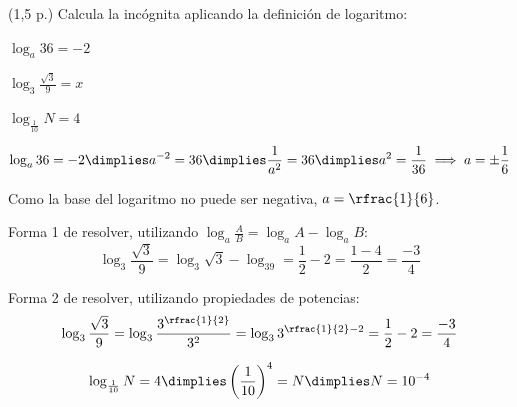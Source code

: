 \documentclass[palatino,nosec]{Docencia}
\begin{document}
\begin{problem} (1,5 p.)
Calcula la incógnita aplicando la definición de logaritmo:

\ppart $\log_a 36 = -2$

\ppart $\log_3\frac{\sqrt{3}}{9} = x$

\ppart $\log_{\frac{1}{10}}N = 4$

\solution

\spart 

\[\log_a 36 = -2 \dimplies a^{-2} = 36 \dimplies \frac{1}{a^2}=36 \dimplies a^2=\frac{1}{36} \implies a=\pm\frac{1}{6}\]

Como la base del logaritmo no puede ser negativa, $a=\rfrac{1}{6}$.

\spart 

Forma 1 de resolver, utilizando $\log_a\frac{A}{B} = \log_aA-\log_aB$:
\[
	\log_3\frac{\sqrt{3}}{9} = \log_3\sqrt{3} - \log_39 = \frac{1}{2}-2=\frac{1-4}{2} = \frac{-3}{4}
\]

Forma 2 de resolver, utilizando propiedades de potencias:
\[
	\log_3\frac{\sqrt{3}}{9} = \log_3\frac{3^{\rfrac{1}{2}}}{3^2} =\log_33^{\rfrac{1}{2}-2} = \frac{1}{2}-2 = \frac{-3}{4} 
\]

\spart 

\[	\log_{\frac{1}{10}}N = 4 \dimplies \left(\frac{1}{10}\right)^4 = N \dimplies N=10^{-4}\]

\end{problem}
\end{document}
